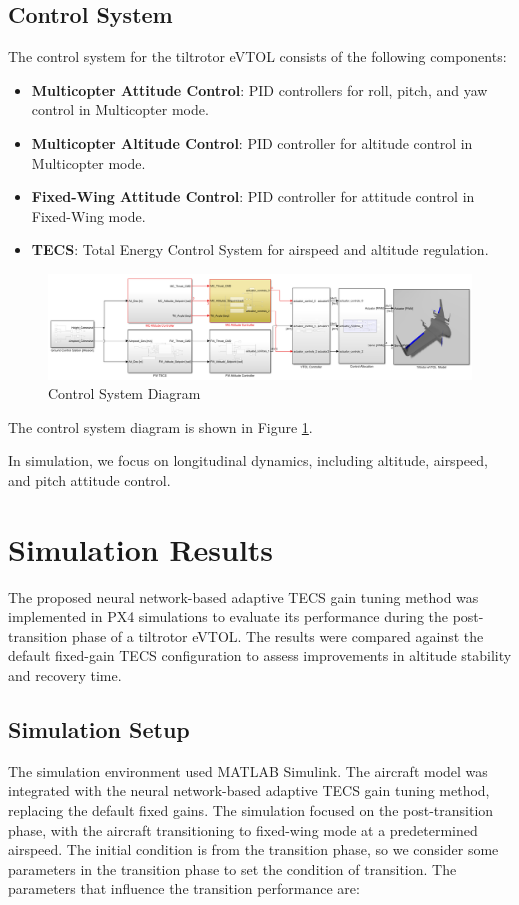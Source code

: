 \documentclass[journal,article,submit,pdftex,moreauthors]{Definitions/mdpi}
\begin{document}
\subsection{Control System}
The control system for the tiltrotor eVTOL consists of the following components:
\begin{itemize}
    \item \textbf{Multicopter Attitude Control}: PID controllers for roll, pitch, and yaw control in Multicopter mode.
    \item \textbf{Multicopter Altitude Control}: PID controller for altitude control in Multicopter mode.
    \item \textbf{Fixed-Wing Attitude Control}: PID controller for attitude control in Fixed-Wing mode.
    \item \textbf{TECS}: Total Energy Control System for airspeed and altitude regulation.
\end{itemize}

\begin{figure}[H]
    \centering
    \includegraphics[width=0.8\linewidth]{control_system_diagram.png}
    \caption{Control System Diagram}
    \label{fig:control_system_diagram}
\end{figure}

The control system diagram is shown in Figure \ref{fig:control_system_diagram}.

In simulation, we focus on longitudinal dynamics, including altitude, airspeed, and pitch attitude control. 



\section{Simulation Results}
The proposed neural network-based adaptive TECS gain tuning method was implemented in PX4 simulations to evaluate its performance during the post-transition phase of a tiltrotor eVTOL. The results were compared against the default fixed-gain TECS configuration to assess improvements in altitude stability and recovery time.

\subsection{Simulation Setup}
The simulation environment used MATLAB Simulink. The aircraft model was integrated with the neural network-based adaptive TECS gain tuning method, replacing the default fixed gains. The simulation focused on the post-transition phase, with the aircraft transitioning to fixed-wing mode at a predetermined airspeed. The initial condition is from the transition phase, so we consider some parameters in the transition phase to set the condition of transition. The parameters that influence the transition performance are:
\end{document}

